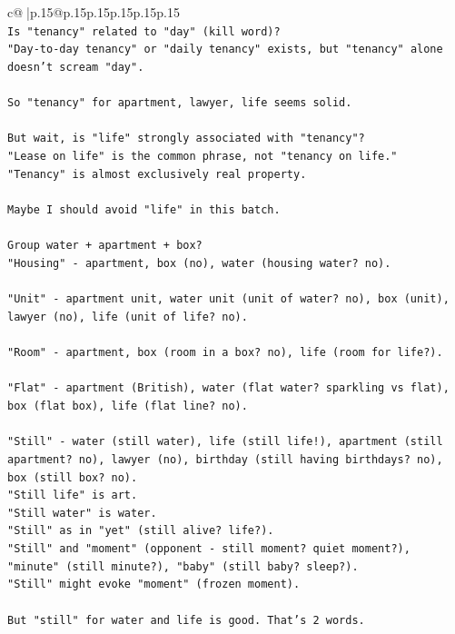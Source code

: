 \documentclass{article}
\begin{document}
{\begin{supertabular}{c@{$\;$}|p{.15\linewidth}@{}p{.15\linewidth}p{.15\linewidth}p{.15\linewidth}p{.15\linewidth}p{.15\linewidth}}
{{{\\ 
\texttt{Is "tenancy" related to "day" (kill word)?} \\
\texttt{"Day{-}to{-}day tenancy" or "daily tenancy" exists, but "tenancy" alone doesn't scream "day".} \\
\\ 
\texttt{So "tenancy" for apartment, lawyer, life seems solid.} \\
\\ 
\texttt{But wait, is "life" strongly associated with "tenancy"?} \\
\texttt{"Lease on life" is the common phrase, not "tenancy on life."} \\
\texttt{"Tenancy" is almost exclusively real property.} \\
\\ 
\texttt{Maybe I should avoid "life" in this batch.} \\
\\ 
\texttt{Group water + apartment + box?} \\
\texttt{"Housing" {-} apartment, box (no), water (housing water? no).} \\
\\ 
\texttt{"Unit" {-} apartment unit, water unit (unit of water? no), box (unit), lawyer (no), life (unit of life? no).} \\
\\ 
\texttt{"Room" {-} apartment, box (room in a box? no), life (room for life?).} \\
\\ 
\texttt{"Flat" {-} apartment (British), water (flat water? sparkling vs flat), box (flat box), life (flat line? no).} \\
\\ 
\texttt{"Still" {-} water (still water), life (still life!), apartment (still apartment? no), lawyer (no), birthday (still having birthdays? no), box (still box? no).} \\
\texttt{"Still life" is art.} \\
\texttt{"Still water" is water.} \\
\texttt{"Still" as in "yet" (still alive? life?).} \\
\texttt{"Still" and "moment" (opponent {-} still moment? quiet moment?), "minute" (still minute?), "baby" (still baby? sleep?).} \\
\texttt{"Still" might evoke "moment" (frozen moment).} \\
\\ 
\texttt{But "still" for water and life is good. That's 2 words.} \\
}}}
\end{supertabular}}
\end{document}
